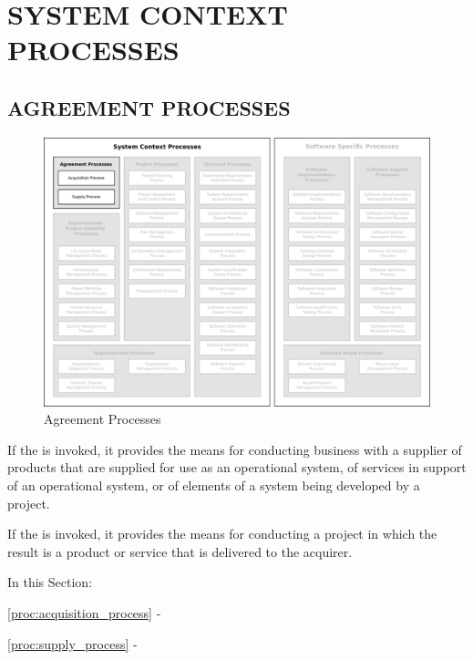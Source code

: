 \section{SYSTEM CONTEXT PROCESSES \label{sec:system_context_processes}}

	\subsection{AGREEMENT PROCESSES\label{subsec:agreement_processes}}

	\begin{figure}[h]
		\centering
		\includegraphics[width=15cm,keepaspectratio]{figures/life-cycle-process-groups-agreement-processes.pdf}
		\caption{Agreement Processes}
		\label{fig:agreement_processes}
	\end{figure}

	\begin{adjustwidth}{1em}{0pt}

		If the  is invoked, it provides the means for conducting business with a supplier of products that are supplied for use as an operational system, of services in support of an operational system, or of elements of a system being developed by a project. 

		If the  is invoked, it provides the means for conducting a project in which the result is a product or service that is delivered to the acquirer.

		In this Section:

		\begin{compactitem}
			\item \ref{proc:acquisition_process} - 
			\item \ref{proc:supply_process} - 
		\end{compactitem}

	\end{adjustwidth}

